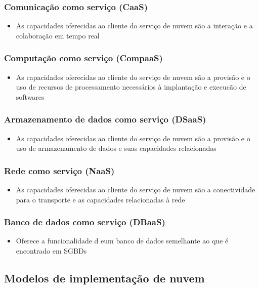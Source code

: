 \begin{frame}
	\frametitle{Comunicação como serviço (CaaS)}
	\begin{itemize}
		\item As capacidades oferecidas ao cliente do serviço de nuvem são a interação e a colaboração em tempo real
	\end{itemize}
\end{frame}

\begin{frame}
	\frametitle{Computação como serviço (CompaaS)}
	\begin{itemize}
		\item As capacidades oferecidas ao cliente do serviço de nuvem são a provisão e o uso de recursos de processamento necessários à implantação e execucão de softwares
	\end{itemize}
\end{frame}

\begin{frame}
	\frametitle{Armazenamento de dados como serviço (DSaaS)}
	\begin{itemize}
		\item As capacidades oferecidas ao cliente do serviço de nuvem são a provisão e o uso de armazenamento de dados e suas capacidades relacionadas
	\end{itemize}
\end{frame}

\begin{frame}
	\frametitle{Rede como serviço (NaaS)}
	\begin{itemize}
		\item As capacidades oferecidas ao cliente do serviço de nuvem são a conectividade para o transporte e as capacidades relacionadas à rede
	\end{itemize}
\end{frame}

\begin{frame}
	\frametitle{Banco de dados como serviço (DBaaS)}
	\begin{itemize}
		\item Oferece a funcionalidade d eum banco de dados semelhante ao que é encontrado em SGBDs
	\end{itemize}
\end{frame}

\subsection{Modelos de implementação de nuvem}

